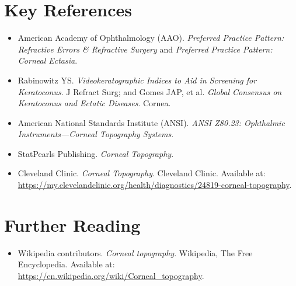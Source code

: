 \section{Key References}
\begin{itemize}
    \item American Academy of Ophthalmology (AAO). \textit{Preferred Practice Pattern: Refractive Errors \& Refractive Surgery} and \textit{Preferred Practice Pattern: Corneal Ectasia}.
    \item Rabinowitz YS. \textit{Videokeratographic Indices to Aid in Screening for Keratoconus}. J Refract Surg; and Gomes JAP, et al. \textit{Global Consensus on Keratoconus and Ectatic Diseases}. Cornea.
    \item American National Standards Institute (ANSI). \textit{ANSI Z80.23: Ophthalmic Instruments---Corneal Topography Systems}.
    \item StatPearls Publishing. \textit{Corneal Topography}.
    \item Cleveland Clinic. \textit{Corneal Topography}. Cleveland Clinic. Available at: \url{https://my.clevelandclinic.org/health/diagnostics/24819-corneal-topography}.
\end{itemize}

\section{Further Reading}
\begin{itemize}
  \item Wikipedia contributors. \textit{Corneal topography}. Wikipedia, The Free Encyclopedia. Available at: \url{https://en.wikipedia.org/wiki/Corneal_topography}.
\end{itemize}
